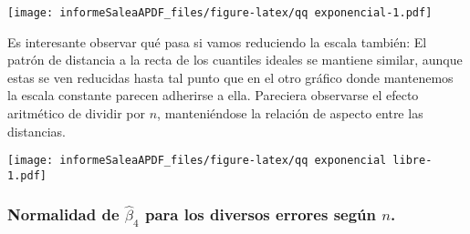 \documentclass[]{article}
\newenvironment{Shaded}{\begin{snugshade}}{\end{snugshade}}
\newcommand{\DataTypeTok}[1]{\textcolor[rgb]{0.13,0.29,0.53}{#1}}
\newcommand{\DecValTok}[1]{\textcolor[rgb]{0.00,0.00,0.81}{#1}}
\newcommand{\KeywordTok}[1]{\textcolor[rgb]{0.13,0.29,0.53}{\textbf{#1}}}
\newcommand{\NormalTok}[1]{#1}
\newcommand{\OperatorTok}[1]{\textcolor[rgb]{0.81,0.36,0.00}{\textbf{#1}}}
\newcommand{\StringTok}[1]{\textcolor[rgb]{0.31,0.60,0.02}{#1}}
\begin{document}
\texttt{[image: informeSaleaAPDF\_files/figure-latex/qq exponencial-1.pdf]}

Es interesante observar qué pasa si vamos reduciendo la escala también:
El patrón de distancia a la recta de los cuantiles ideales se mantiene
similar, aunque estas se ven reducidas hasta tal punto que en el otro
gráfico donde mantenemos la escala constante parecen adherirse a ella.
Pareciera observarse el efecto aritmético de dividir por \(n\),
manteniéndose la relación de aspecto entre las distancias.

\begin{Shaded}
\end{Shaded}

\texttt{[image: informeSaleaAPDF\_files/figure-latex/qq exponencial libre-1.pdf]}

\hypertarget{normalidad-de-hatbeta_4-para-los-diversos-errores-segun-n.}{%
\subsubsection{\texorpdfstring{Normalidad de \(\hat{\beta}_4\) para los
diversos errores según
\(n\).}{Normalidad de \textbackslash hat\{\textbackslash beta\}\_4 para los diversos errores según n.}}\label{normalidad-de-hatbeta_4-para-los-diversos-errores-segun-n.}}
\end{document}
